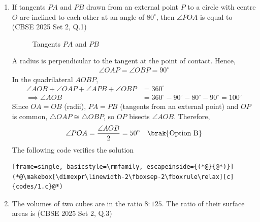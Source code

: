 \begin{enumerate}[label=\thesubsection.\arabic*, ref=\thesubsection.\theenumi]
\item
If tangents $PA$ and $PB$ drawn from an external point $P$ to a circle with centre $O$ are inclined to each other at an angle of $80^\circ$, then $\angle POA$ is equal to
\hfill (CBSE 2025 Set 2, Q.1)
\begin{enumerate}
	\begin{multicols}{4}
    \item $40^\circ$
    \item $50^\circ$
    \item $60^\circ$
    \item $80^\circ$
	\end{multicols}
\end{enumerate}
\begin{figure}[H]
	\centering

	\caption{Tangents $PA$ and $PB$}
	\label{fig:CBSE25S2-q1}
\end{figure}

\solution
A radius is perpendicular to the tangent at the point of contact. Hence,
\begin{align}
	\angle OAP = \angle OBP = 90^\circ
\end{align}
In the quadrilateral $AOBP$,
\begin{align}
	\angle AOB + \angle OAP + \angle APB + \angle OBP &= 360^\circ
	\\
	\implies \angle AOB &= 360^\circ - 90^\circ - 80^\circ - 90^\circ = 100^\circ
\end{align}
Since $OA = OB$ (radii), $PA = PB$ (tangents from an external point) and $OP$ is common, $\triangle OAP \cong \triangle OBP$, so $OP$ bisects $\angle AOB$. Therefore,
\begin{align}
	\angle POA = \frac{\angle AOB}{2} = 50^\circ \quad \brak{\text{Option B}}
\end{align}
The following code verifies the solution
\begin{lstlisting}[frame=single, basicstyle=\rmfamily, escapeinside={(*@}{@*)}]
(*@\makebox[\dimexpr\linewidth-2\fboxsep-2\fboxrule\relax][c]{codes/1.c}@*)
\end{lstlisting}

\item
The volumes of two cubes are in the ratio $8:125$. The ratio of their surface areas is
\hfill (CBSE 2025 Set 2, Q.3)
\begin{enumerate}
\end{enumerate}



\end{enumerate}
